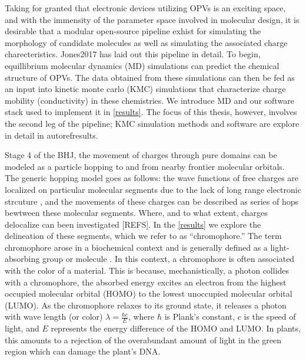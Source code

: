 Taking for granted that electronic devices utilizing OPVs is an exciting
space, and with the immensity of the parameter space involved in molecular design, it is desirable that a modular
open-source pipeline exhist for simulating the morphology of candidate molecules as well as simulating the 
associated charge charecteristics. Jones2017 has laid out this
pipeline in detail. To begin, equillibrium molecular dynamics (MD) simulations can predict the chemical
structure of OPVs. The data obtained from these simulations can then be fed as an input into kinetic monte
carlo (KMC) simulations that characterize charge mobility (conductivity) in these chemistries. We introduce MD
and our software stack used to implement it in \autoref{results}. The focus of this thesis, however, involves
the second leg of the pipeline; KMC simulation methods and software are explore in detail in autoref{results}.


Stage 4 of the BHJ, the movement of charges through pure domains can be modeled as a particle hopping 
to and from nearby frontier molecular orbitals.
The generic hopping model goes as follows: the wave functions of
free charges are localized on particular molecular segments due to the lack of long range electronic strcuture
, and the movements of these charges can be described as series
of hops bewtween these molecular segments. Where, and to what extent, charges delocalize can been investigated
[REFS]. In the \autoref{results} we explore the delineation of these segments, which we refer to as
``chromophore.'' 
The term chromophore arose in a biochemical context and is generally defined
as a light-absorbing group or molecule \cite{biochemistry}.
In this context, a chromophore is often associated with the color of a material.
This is because, mechanistically, a photon collides with a chromophore, the absorbed energy
excites an electron from the highest occupied molecular orbital (HOMO) to the
lowest unoccupied molecular orbital (LUMO). As the chromophore relaxes to its
ground state, it releases a photon with wave length (or color) $\lambda = \frac{\hbar c}{E}$,
where $\hbar$ is Plank's constant, $c$ is the speed of light, and $E$ represents the
energy difference of the HOMO and LUMO. In plants, this amounts to a rejection of the overabundant amount of
light in the green region which can damage the plant's DNA. 

